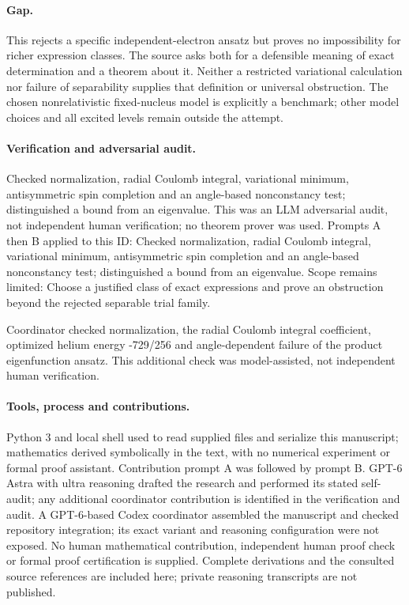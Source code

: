 \documentclass[11pt]{article}
\begin{document}
\paragraph{Gap.}This rejects a specific independent-electron ansatz but proves no impossibility for richer expression classes. The source asks both for a defensible meaning of exact determination and a theorem about it. Neither a restricted variational calculation nor failure of separability supplies that definition or universal obstruction. The chosen nonrelativistic fixed-nucleus model is explicitly a benchmark; other model choices and all excited levels remain outside the attempt.

\paragraph{Verification and adversarial audit.}
Checked normalization, radial Coulomb integral, variational minimum, antisymmetric spin completion and an angle-based nonconstancy test; distinguished a bound from an eigenvalue. This was an LLM adversarial audit, not independent human verification; no theorem prover was used. Prompts A then B applied to this ID: Checked normalization, radial Coulomb integral, variational minimum, antisymmetric spin completion and an angle-based nonconstancy test; distinguished a bound from an eigenvalue. Scope remains limited: Choose a justified class of exact expressions and prove an obstruction beyond the rejected separable trial family.

Coordinator checked normalization, the radial Coulomb integral coefficient, optimized helium energy -729/256 and angle-dependent failure of the product eigenfunction ansatz. This additional check was model-assisted, not independent human verification.

\paragraph{Tools, process and contributions.}
Python 3 and local shell used to read supplied files and serialize this manuscript; mathematics derived symbolically in the text, with no numerical experiment or formal proof assistant. Contribution prompt A was followed by prompt B. GPT-6 Astra with ultra reasoning drafted the research and performed its stated self-audit; any additional coordinator contribution is identified in the verification and audit. A GPT-6-based Codex coordinator assembled the manuscript and checked repository integration; its exact variant and reasoning configuration were not exposed. No human mathematical contribution, independent human proof check or formal proof certification is supplied. Complete derivations and the consulted source references are included here; private reasoning transcripts are not published.
\end{document}
